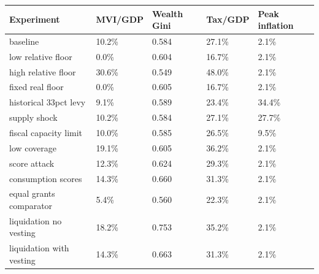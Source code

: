 \begin{tabular}{lllll}
\toprule
Experiment & MVI/GDP & Wealth Gini & Tax/GDP & Peak inflation \\
\midrule
baseline & 10.2\% & 0.584 & 27.1\% & 2.1\% \\
low relative floor & 0.0\% & 0.604 & 16.7\% & 2.1\% \\
high relative floor & 30.6\% & 0.549 & 48.0\% & 2.1\% \\
fixed real floor & 0.0\% & 0.605 & 16.7\% & 2.1\% \\
historical 33pct levy & 9.1\% & 0.589 & 23.4\% & 34.4\% \\
supply shock & 10.2\% & 0.584 & 27.1\% & 27.7\% \\
fiscal capacity limit & 10.0\% & 0.585 & 26.5\% & 9.5\% \\
low coverage & 19.1\% & 0.605 & 36.2\% & 2.1\% \\
score attack & 12.3\% & 0.624 & 29.3\% & 2.1\% \\
consumption scores & 14.3\% & 0.660 & 31.3\% & 2.1\% \\
equal grants comparator & 5.4\% & 0.560 & 22.3\% & 2.1\% \\
liquidation no vesting & 18.2\% & 0.753 & 35.2\% & 2.1\% \\
liquidation with vesting & 14.3\% & 0.663 & 31.3\% & 2.1\% \\
\bottomrule
\end{tabular}
